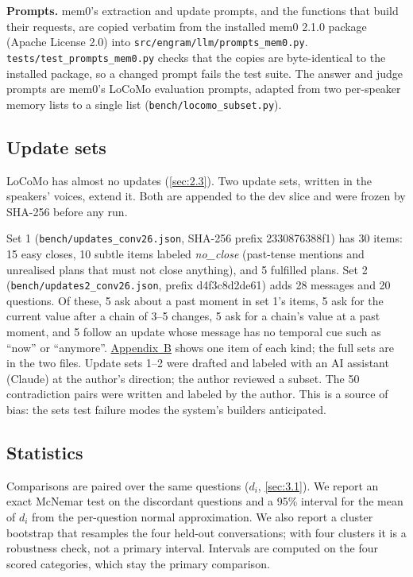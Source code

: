 \documentclass[11pt]{article}
\newcommand{\src}[1]{}
\begin{document}
\textbf{Prompts.} mem0's extraction and update prompts, and the functions that build their requests, are copied verbatim from the installed mem0 2.1.0 package (Apache License 2.0) into \texttt{src/\allowbreak{}engram/\allowbreak{}llm/\allowbreak{}prompts\_\allowbreak{}mem0.py}. \texttt{tests/\allowbreak{}test\_\allowbreak{}prompts\_\allowbreak{}mem0.py} checks that the copies are byte-identical to the installed package, so a changed prompt fails the test suite. The answer and judge prompts are mem0's LoCoMo evaluation prompts, adapted from two per-speaker memory lists to a single list (\texttt{bench/\allowbreak{}locomo\_\allowbreak{}subset.py}).

\subsection{Update sets}\label{sec:4.3}
LoCoMo has almost no updates (\cref{sec:2.3}). Two update sets, written in the speakers' voices, extend it. Both are appended to the dev slice and were frozen by SHA-256 before any run.

Set 1 (\texttt{bench/\allowbreak{}updates\_\allowbreak{}conv26.json}, SHA-256 prefix 2330876388f1\src{bench/updates\_conv26.json}) has 30\src{bench/updates\_conv26.json} items: 15\src{bench/updates\_conv26.json} easy closes, 10\src{bench/updates\_conv26.json} subtle items labeled \emph{no\_close} (past-tense mentions and unrealised plans that must not close anything), and 5\src{bench/updates\_conv26.json} fulfilled plans. Set 2 (\texttt{bench/\allowbreak{}updates2\_\allowbreak{}conv26.json}, prefix d4f3c8d2de61\src{bench/updates2\_conv26.json}) adds 28\src{bench/updates2\_conv26.json} messages and 20\src{bench/updates2\_conv26.json} questions. Of these, 5\src{bench/updates2\_conv26.json} ask about a past moment in set 1's items, 5\src{bench/updates2\_conv26.json} ask for the current value after a chain of 3--5 changes, 5\src{bench/updates2\_conv26.json} ask for a chain's value at a past moment, and 5\src{bench/updates2\_conv26.json} follow an update whose message has no temporal cue such as ``now'' or ``anymore''. \hyperref[app:B]{Appendix~B} shows one item of each kind; the full sets are in the two files. Update sets 1--2 were drafted and labeled with an AI assistant (Claude) at the author's direction; the author reviewed a subset. The 50 contradiction pairs were written and labeled by the author. This is a source of bias: the sets test failure modes the system's builders anticipated.

\subsection{Statistics}\label{sec:4.4}
Comparisons are paired over the same questions ($d_i$, \cref{sec:3.1}). We report an exact McNemar test on the discordant questions and a 95\% interval for the mean of $d_i$ from the per-question normal approximation. We also report a cluster bootstrap that resamples the four held-out conversations; with four clusters it is a robustness check, not a primary interval. Intervals are computed on the four scored categories, which stay the primary comparison.
\end{document}
